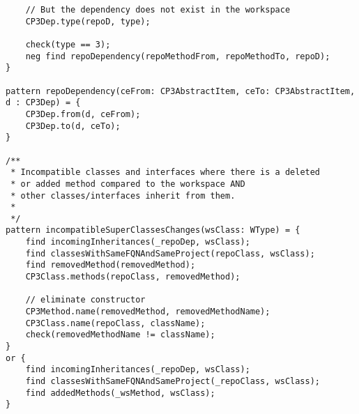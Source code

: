 \begin{lstlisting}
    // But the dependency does not exist in the workspace
    CP3Dep.type(repoD, type);
    
    check(type == 3);
    neg find repoDependency(repoMethodFrom, repoMethodTo, repoD);
}

pattern repoDependency(ceFrom: CP3AbstractItem, ceTo: CP3AbstractItem, d : CP3Dep) = {
    CP3Dep.from(d, ceFrom);
    CP3Dep.to(d, ceTo);
}

/**
 * Incompatible classes and interfaces where there is a deleted 
 * or added method compared to the workspace AND 
 * other classes/interfaces inherit from them.
 * 
 */
pattern incompatibleSuperClassesChanges(wsClass: WType) = {
    find incomingInheritances(_repoDep, wsClass);
    find classesWithSameFQNAndSameProject(repoClass, wsClass);
    find removedMethod(removedMethod);
    CP3Class.methods(repoClass, removedMethod);
    
    // eliminate constructor
    CP3Method.name(removedMethod, removedMethodName);
    CP3Class.name(repoClass, className);
    check(removedMethodName != className);
} 
or {
    find incomingInheritances(_repoDep, wsClass);
    find classesWithSameFQNAndSameProject(_repoClass, wsClass);
    find addedMethods(_wsMethod, wsClass);
}
\end{lstlisting}
